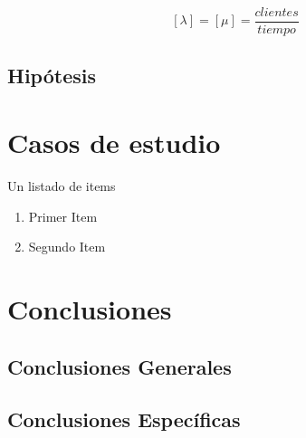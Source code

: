 $$[\lambda] = [\mu] = \frac{clientes}{tiempo} $$

\subsection{Hipótesis}

\section{Casos de estudio}

Un listado de items

\begin{enumerate}
  \item Primer Item
  \item Segundo Item
\end{enumerate}


\section{Conclusiones}

\subsection{Conclusiones Generales}

\subsection{Conclusiones Específicas}





